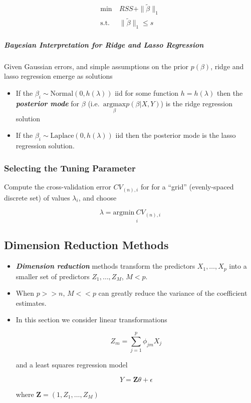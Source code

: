 \documentclass[11pt]{article}
\begin{document}
\begin{align*}
\min&\ RSS + \|\tilde{\beta}\|_1\\
\text{s.t.}&\ \| \tilde{\beta} \|_1 \leqslant s
\end{align*}

    \hypertarget{bayesian-interpretation-for-ridge-and-lasso-regression}{%
\subparagraph{Bayesian Interpretation for Ridge and Lasso
Regression}\label{bayesian-interpretation-for-ridge-and-lasso-regression}}

    Given Gaussian errors, and simple assumptions on the prior \(p(\beta)\),
ridge and lasso regression emerge as solutions

\begin{itemize}
\item
  If the \(\beta_i \sim \text{Normal}(0, h(\lambda))\) iid for some
  function \(h=h(\lambda)\) then the \textbf{\emph{posterior mode}} for
  \(\beta\) (i.e.~\(\underset{\beta}{\text{argmax}} p(\beta| X, Y)\)) is
  the ridge regression solution
\item
  If the \(\beta_i \sim \text{Laplace}(0, h(\lambda))\) iid then the
  posterior mode is the lasso regression solution.
\end{itemize}

    \hypertarget{selecting-the-tuning-parameter}{%
\subsubsection{Selecting the Tuning
Parameter}\label{selecting-the-tuning-parameter}}

    Compute the cross-validation error \(CV_{(n),i}\) for for a ``grid''
(evenly-spaced discrete set) of values \(\lambda_i\), and choose

\[ \lambda = \underset{i}{\text{argmin}\ CV_{(n),i}}\]

    \hypertarget{dimension-reduction-methods}{%
\subsection{Dimension Reduction
Methods}\label{dimension-reduction-methods}}

    \begin{itemize}
\item
  \textbf{\emph{Dimension reduction}} methods transform the predictors
  \(X_1, \dots, X_p\) into a smaller set of predictors
  \(Z_1, \dots, Z_M\), \(M < p\).
\item
  When \(p >> n\), \(M << p\) can greatly reduce the variance of the
  coefficient estimates.
\item
  In this section we consider linear transformations

  \[Z_m = \sum_{j = 1}^p \phi_{jm}X_j\]

  and a least squares regression model

  \[ Y = \mathbf{Z}\theta + \epsilon \]

  where \(\mathbf{Z} = (1,Z_1, \dots, Z_M)\)
\end{itemize}
\end{document}
